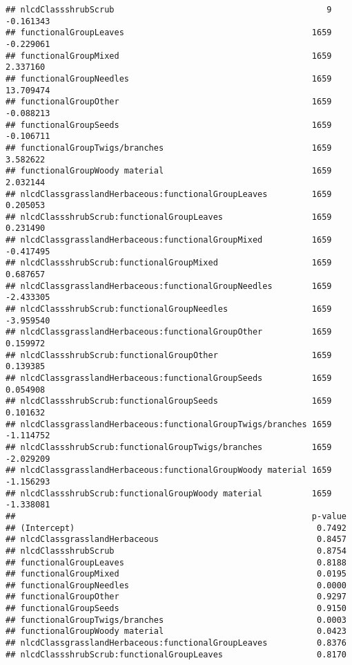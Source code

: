 \documentclass[]{article}
\begin{document}
\begin{verbatim}
## nlcdClassshrubScrub                                           9 -0.161343
## functionalGroupLeaves                                      1659 -0.229061
## functionalGroupMixed                                       1659  2.337160
## functionalGroupNeedles                                     1659 13.709474
## functionalGroupOther                                       1659 -0.088213
## functionalGroupSeeds                                       1659 -0.106711
## functionalGroupTwigs/branches                              1659  3.582622
## functionalGroupWoody material                              1659  2.032144
## nlcdClassgrasslandHerbaceous:functionalGroupLeaves         1659  0.205053
## nlcdClassshrubScrub:functionalGroupLeaves                  1659  0.231490
## nlcdClassgrasslandHerbaceous:functionalGroupMixed          1659 -0.417495
## nlcdClassshrubScrub:functionalGroupMixed                   1659  0.687657
## nlcdClassgrasslandHerbaceous:functionalGroupNeedles        1659 -2.433305
## nlcdClassshrubScrub:functionalGroupNeedles                 1659 -3.959540
## nlcdClassgrasslandHerbaceous:functionalGroupOther          1659  0.159972
## nlcdClassshrubScrub:functionalGroupOther                   1659  0.139385
## nlcdClassgrasslandHerbaceous:functionalGroupSeeds          1659  0.054908
## nlcdClassshrubScrub:functionalGroupSeeds                   1659  0.101632
## nlcdClassgrasslandHerbaceous:functionalGroupTwigs/branches 1659 -1.114752
## nlcdClassshrubScrub:functionalGroupTwigs/branches          1659 -2.029209
## nlcdClassgrasslandHerbaceous:functionalGroupWoody material 1659 -1.156293
## nlcdClassshrubScrub:functionalGroupWoody material          1659 -1.338081
##                                                            p-value
## (Intercept)                                                 0.7492
## nlcdClassgrasslandHerbaceous                                0.8457
## nlcdClassshrubScrub                                         0.8754
## functionalGroupLeaves                                       0.8188
## functionalGroupMixed                                        0.0195
## functionalGroupNeedles                                      0.0000
## functionalGroupOther                                        0.9297
## functionalGroupSeeds                                        0.9150
## functionalGroupTwigs/branches                               0.0003
## functionalGroupWoody material                               0.0423
## nlcdClassgrasslandHerbaceous:functionalGroupLeaves          0.8376
## nlcdClassshrubScrub:functionalGroupLeaves                   0.8170

\end{verbatim}
\end{document}

